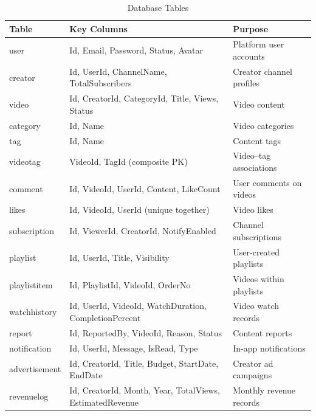 \documentclass[a4paper, twoside]{article}
\begin{document}
\begin{table}[H]
\centering
\caption{Database Tables}
\label{tab:DBTables}
\begin{tabular}{|l|l|l|}
\hline
\textbf{Table}       & \textbf{Key Columns}                                          & \textbf{Purpose}                          \\ \hline
user                 & Id, Email, Password, Status, Avatar                           & Platform user accounts                    \\ \hline
creator              & Id, UserId, ChannelName, TotalSubscribers                     & Creator channel profiles                  \\ \hline
video                & Id, CreatorId, CategoryId, Title, Views, Status               & Video content                             \\ \hline
category             & Id, Name                                                      & Video categories                          \\ \hline
tag                  & Id, Name                                                      & Content tags                              \\ \hline
videotag             & VideoId, TagId (composite PK)                                 & Video--tag associations                   \\ \hline
comment              & Id, VideoId, UserId, Content, LikeCount                       & User comments on videos                   \\ \hline
likes                & Id, VideoId, UserId (unique together)                         & Video likes                               \\ \hline
subscription         & Id, ViewerId, CreatorId, NotifyEnabled                        & Channel subscriptions                     \\ \hline
playlist             & Id, UserId, Title, Visibility                                 & User-created playlists                    \\ \hline
playlistitem         & Id, PlaylistId, VideoId, OrderNo                              & Videos within playlists                   \\ \hline
watchhistory         & Id, UserId, VideoId, WatchDuration, CompletionPercent         & Video watch records                       \\ \hline
report               & Id, ReportedBy, VideoId, Reason, Status                       & Content reports                           \\ \hline
notification         & Id, UserId, Message, IsRead, Type                             & In-app notifications                      \\ \hline
advertisement        & Id, CreatorId, Title, Budget, StartDate, EndDate              & Creator ad campaigns                      \\ \hline
revenuelog           & Id, CreatorId, Month, Year, TotalViews, EstimatedRevenue      & Monthly revenue records                   \\ \hline
\end{tabular}
\end{table}
\end{document}
